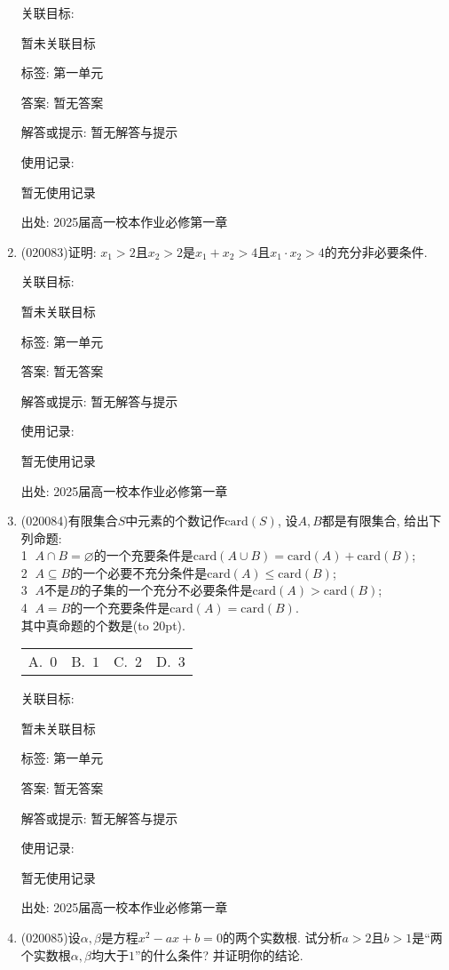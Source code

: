 \documentclass[10pt,a4paper]{article}
\newcommand{\bracket}[1]{(\hbox to #1pt{})}
\newcommand{\fourch}[4]{\par\begin{tabular}{p{.23\textwidth}p{.23\textwidth}p{.23\textwidth}p{.23\textwidth}}
A.~#1 &B.~#2& C.~#3& D.~#4
\end{tabular}}
\begin{document}
\begin{enumerate}[1.]
关联目标:

暂未关联目标



标签: 第一单元

答案: 暂无答案

解答或提示: 暂无解答与提示

使用记录:

暂无使用记录


出处: 2025届高一校本作业必修第一章
\item { (020083)}证明: $x_1>2$且$x_2>2$是$x_1+x_2>4$且$x_1\cdot x_2>4$的充分非必要条件.


关联目标:

暂未关联目标



标签: 第一单元

答案: 暂无答案

解答或提示: 暂无解答与提示

使用记录:

暂无使用记录


出处: 2025届高一校本作业必修第一章
\item { (020084)}有限集合$S$中元素的个数记作$\mathrm{card}(S)$, 设$A,B$都是有限集合, 给出下列命题:\\
\textcircled{1} $A\cap B=\varnothing$的一个充要条件是$\mathrm{card}(A\cup B)=\mathrm{card}(A)+\mathrm{card}(B)$;\\
\textcircled{2} $A\subseteq B$的一个必要不充分条件是$\mathrm{card}(A)\le \mathrm{card}(B)$; \\
\textcircled{3} $A$不是$B$的子集的一个充分不必要条件是$\mathrm{card}(A)>\mathrm{card}(B)$;\\ 
\textcircled{4} $A=B$的一个充要条件是$\mathrm{card}(A)=\mathrm{card}(B)$.\\ 
其中真命题的个数是\bracket{20}.
\fourch{$0$}{$1$}{$2$}{$3$}


关联目标:

暂未关联目标



标签: 第一单元

答案: 暂无答案

解答或提示: 暂无解答与提示

使用记录:

暂无使用记录


出处: 2025届高一校本作业必修第一章
\item { (020085)}设$\alpha,\beta$是方程$x^2-ax+b=0$的两个实数根. 试分析$a>2$且$b>1$是``两个实数根$\alpha,\beta$均大于$1$''的什么条件? 并证明你的结论.



\end{enumerate}
\end{document}
